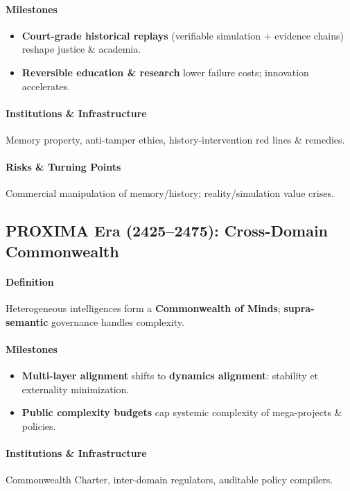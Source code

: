 \documentclass[11pt]{article}
\begin{document}
\paragraph{Milestones}
\begin{itemize}[noitemsep]
  \item \textbf{Court-grade historical replays} (verifiable simulation + evidence chains) reshape justice \& academia.
  \item \textbf{Reversible education \& research} lower failure costs; innovation accelerates.
\end{itemize}

\paragraph{Institutions \& Infrastructure} Memory property, anti-tamper ethics, history-intervention red lines \& remedies.

\paragraph{Risks \& Turning Points} Commercial manipulation of memory/history; reality/simulation value crises.

\subsection{PROXIMA Era (2425–2475): Cross-Domain Commonwealth}
\paragraph{Definition} Heterogeneous intelligences form a \textbf{Commonwealth of Minds}; \textbf{supra-semantic} governance handles complexity.

\paragraph{Milestones}
\begin{itemize}[noitemsep]
  \item \textbf{Multi-layer alignment} shifts to \textbf{dynamics alignment}: stability et externality minimization.
  \item \textbf{Public complexity budgets} cap systemic complexity of mega-projects \& policies.
\end{itemize}

\paragraph{Institutions \& Infrastructure} Commonwealth Charter, inter-domain regulators, auditable policy compilers.
\end{document}
